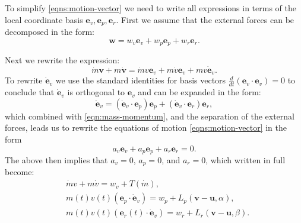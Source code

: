 \documentclass{article}
\renewcommand{\vec}[1]{\boldsymbol{#1}}
\begin{document}
To simplify \eqref{eqns:motion-vector} we need to write all expressions in terms of the local coordinate basis $\vec e_v, \vec e_p, \vec e_r$. First we assume that the external forces can be decomposed in the form:
\[
\vec w = w_v \vec e_v + w_p \vec e_p + w_r \vec e_r.
\]

Next we rewrite the expression:
\begin{equation} \label{eqn:mass-momentum}
    \dot{m}\vec{v} + m \dot{\vec{v}} = \dot{m}v \vec{e}_v + m \dot v \vec{e}_v + m v \dot{\vec{e}}_v.
\end{equation}
To rewrite $\dot{\vec{e}}_v$ we use the standard identities for basis vectors $\frac{d}{dt}(\vec{e}_v \cdot \vec{e}_v)=0$
to conclude that $\dot{\vec{e}}_v$ is orthogonal to ${\vec{e}}_v$ and can be expanded in the form:
\[
\dot{\vec{e}}_v =  (\dot{\vec{e}}_v \cdot \vec{e}_p)\vec{e}_p + (\dot{\vec{e}}_v \cdot \vec{e}_r)\vec{e}_r,
\] 
which combined with \eqref{eqn:mass-momentum}, and the separation of the external forces, leads us to rewrite the equations of motion \eqref{eqns:motion-vector} in the form 
\[ 
a_v \vec e_v + a_p \vec e_p + a_r \vec e_r = 0.
\]
The above then implies that $a_v =0$, $a_p =0$, and $a_r =0$, which written in full become:
\begin{align} \label{eqn:thrust-momentum}
    &  \dot{m} v + m \dot v = w_v + T(\dot{m}),
    \\
    \label{eqn:turn-momentum}
    &  m(t) v(t)({\vec{e}}_p \cdot \dot{\vec{e}}_v) = w_p + L_p(\vec{v}-\vec{u},\alpha),
    \\
    \label{eqn:lift-momentum}
    & m(t) v(t)({\vec{e}_r}(t) \cdot \dot{\vec{e}}_v)=w_r +L_r(\vec{v}-\vec{u},\beta).
\end{align}
\end{document}
